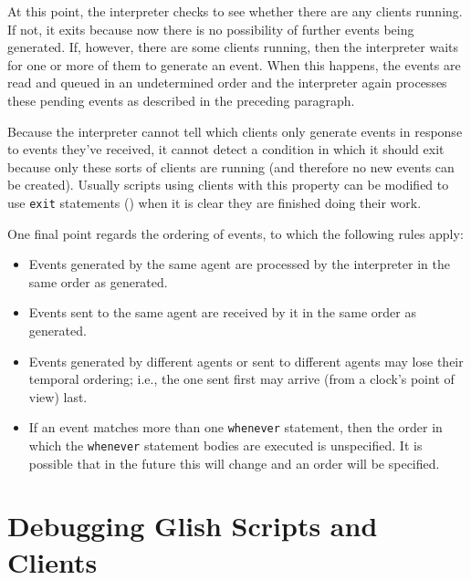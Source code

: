 \begin{sloppy}
At this point, the interpreter checks to see whether there are any clients
running.  If not, it exits because now there is no possibility of 
further events being generated.  If, however, there are some clients
running, then the interpreter waits for one or more of them to generate an
event.  When this happens, the events are read and queued in an
undetermined order and the interpreter again processes these pending events
as described in the preceding paragraph.

Because the interpreter cannot tell which clients only generate events
in response to events they've received, it cannot detect a condition
in which it should exit because only these sorts of clients are running
(and therefore no new events can be created).  Usually scripts using
clients with this property can be modified to use {\tt exit} statements
() when it is clear they are finished doing their work.

One final point regards the ordering of events, to which the following
rules apply:
\begin{itemize}

\item Events generated by the same agent are processed by the interpreter
in the same order as generated.

\item Events sent to the same agent are received by it in the same order
as generated.

\item Events generated by different agents or sent to different agents
may lose their temporal ordering; i.e., the one sent first may arrive
(from a clock's point of view) last.

\item If an event matches more than one {\tt whenever} statement, then
the order in which the {\tt whenever} statement bodies are executed
is unspecified.  It is possible that in the future this will change
and an order will be specified.

\end{itemize}

\section{Debugging Glish Scripts and Clients}


\end{sloppy}
